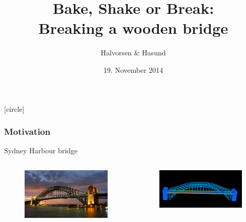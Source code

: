 \documentclass[screen]{beamer}
\title[The Finite Element Method]%
{Bake, Shake or Break: \\Breaking a wooden bridge}
\author[Halvorsen \& Hasund]{Halvorsen \& Hasund}
\institute[NTNU]{The Finite Element Method project}
\date{19. November 2014}
\begin{document}
[circle]

\ntnutitlepage


\begin{frame}
\frametitle{Motivation}

 Sydney Harbour bridge
\begin{columns}   
    \begin{column}{.5\linewidth}
        \begin{figure}
  		\includegraphics[scale=0.25]{figures/Sydney_pic}
  		\end{figure}
    \end{column}   
    \begin{column}{.5\linewidth}

        \begin{figure}
  		\includegraphics[scale=0.12]{figures/sydneyBridge}
  		\end{figure}
    \end{column}
  \end{columns}
\end{frame}
\end{document}
